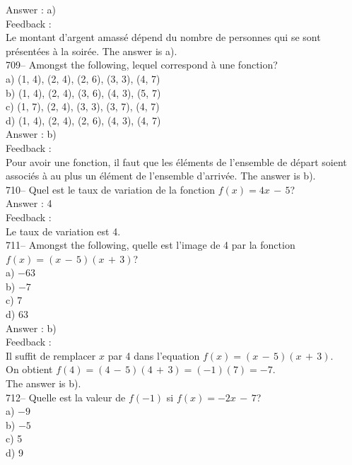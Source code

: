 ﻿\documentclass[letterpaper, 12pt]{article}
\begin{document}
Answer :  a)\\

Feedback :  \\
Le montant d'argent amass\'e d\'epend du nombre de personnes qui se sont
pr\'esent\'ees \`a la soir\'ee.  The answer is a).\\

709-- Amongst the following, lequel correspond \`a une fonction?\\
a) {(1, 4), (2, 4), (2, 6), (3, 3), (4, 7)}\\
b) {(1, 4), (2, 4), (3, 6), (4, 3), (5, 7)}\\
c) {(1, 7), (2, 4), (3, 3), (3, 7), (4, 7)}\\
d) {(1, 4), (2, 4), (2, 6), (4, 3), (4, 7)}\\

Answer :  b)\\

Feedback :  \\
Pour avoir une fonction, il faut que  les \'el\'ements de l'ensemble de
d\'epart soient associ\'es \`a au plus un \'el\'ement de l'ensemble
d'arriv\'ee.  The answer is b).\\

710-- Quel est le taux de variation de la fonction $f(x)=4x\,-\,5$?\\

Answer :  4\\

Feedback :  \\
Le taux de variation est 4.\\

711-- Amongst the following, quelle est l'image de 4 par la
fonction $f(x)=(x\,-\,5)(x\,+\,3)$?\\
a) $-63$\\
b) $-7$\\
c) 7\\
d) 63\\

Answer : b)\\

Feedback : \\
Il suffit de remplacer $x$ par 4 dans l'equation
$f(x)=(x\,-\,5)(x\,+\,3)$.\\
On obtient $f(4)=(4\,-\,5)(4\,+\,3)=(-1)(7)=-7$.\\
The answer is b).\\

712-- Quelle est la valeur de $f(-1)$ si $f(x)=-2x\,-\,7$?\\
a) $-9$\\
b) $-5$\\
c) 5\\
d) 9\\
\end{document}

